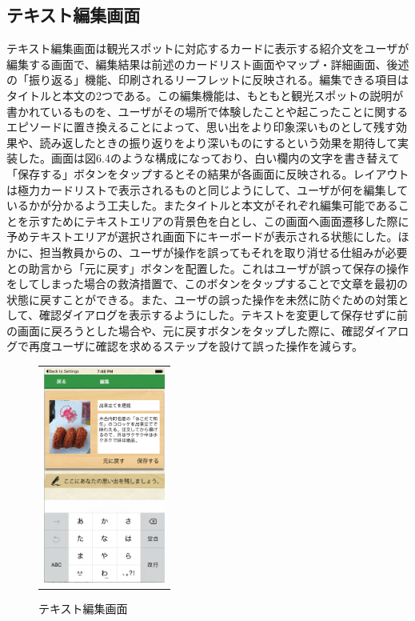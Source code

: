 \subsection{テキスト編集画面}
テキスト編集画面は観光スポットに対応するカードに表示する紹介文をユーザが編集する画面で、編集結果は前述のカードリスト画面やマップ・詳細画面、後述の「振り返る」機能、印刷されるリーフレットに反映される。編集できる項目はタイトルと本文の2つである。この編集機能は、もともと観光スポットの説明が書かれているものを、ユーザがその場所で体験したことや起こったことに関するエピソードに置き換えることによって、思い出をより印象深いものとして残す効果や、読み返したときの振り返りをより深いものにするという効果を期待して実装した。画面は図6.4のような構成になっており、白い欄内の文字を書き替えて「保存する」ボタンをタップするとその結果が各画面に反映される。レイアウトは極力カードリストで表示されるものと同じようにして、ユーザが何を編集しているかが分かるよう工夫した。またタイトルと本文がそれぞれ編集可能であることを示すためにテキストエリアの背景色を白とし、この画面へ画面遷移した際に予めテキストエリアが選択され画面下にキーボードが表示される状態にした。ほかに、担当教員からの、ユーザが操作を誤ってもそれを取り消せる仕組みが必要との助言から「元に戻す」ボタンを配置した。これはユーザが誤って保存の操作をしてしまった場合の救済措置で、このボタンをタップすることで文章を最初の状態に戻すことができる。また、ユーザの誤った操作を未然に防ぐための対策として、確認ダイアログを表示するようにした。テキストを変更して保存せずに前の画面に戻ろうとした場合や、元に戻すボタンをタップした際に、確認ダイアログで再度ユーザに確認を求めるステップを設けて誤った操作を減らす。


\begin{figure}[htbp]
  \begin{center}
    \begin{tabular}{c}

      \begin{minipage}{0.33\hsize}
        \begin{center}
\includegraphics[width=4cm, bb=0 0 303 573]{kiko_edit.png}
        \end{center}
      \end{minipage}

    \end{tabular}
    \caption{テキスト編集画面}
    \label{fig:lena}
  \end{center}
\end{figure}

